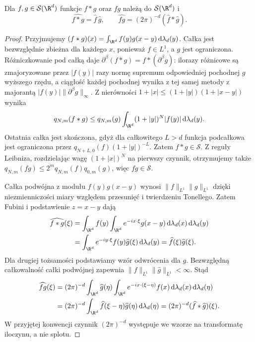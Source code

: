 \begin{wniosek}
\label{cor:pde8-convolution}
Dla $f,g\in\mathcal S(\R^d)$ funkcje $f*g$ oraz
$fg$ należą do $\mathcal S(\R^d)$ i
\[
 \widehat{f*g}=\widehat f\,\widehat g,\qquad
 \widehat{fg}=(2\pi)^{-d}(\widehat f*\widehat g).
\]
\end{wniosek}
\begin{proof}
Przyjmujemy $(f*g)(x)=\int_{\R^d}f(y)g(x-y)
\,\mathrm d\lambda_d(y)$. Całka jest bezwzględnie
zbieżna dla każdego $x$, ponieważ $f\in L^1$,
a $g$ jest ograniczona.
Różniczkowanie pod całką daje
$\partial^\beta(f*g)=f*(\partial^\beta g)$:
ilorazy różnicowe są zmajoryzowane przez
$|f(y)|$ razy normę supremum odpowiedniej
pochodnej $g$ wyższego rzędu, a ciągłość każdej
pochodnej wynika z tej samej metody z majorantą
$|f(y)|\|\partial^\beta g\|_\infty$.
Z nierówności
$1+|x|\le(1+|y|)(1+|x-y|)$ wynika
\[
 q_{N,m}(f*g)
 \le q_{N,m}(g)
 \int_{\R^d}(1+|y|)^N|f(y)|\,\mathrm d\lambda_d(y).
\]
Ostatnia całka jest skończona, gdyż dla
całkowitego $L>d$ funkcja podcałkowa jest
ograniczona przez $q_{N+L,0}(f)(1+|y|)^{-L}$.
Zatem $f*g\in\mathcal S$.
Z reguły Leibniza, rozdzielając wagę
$(1+|x|)^N$ na pierwszy czynnik,
otrzymujemy także
$q_{N,m}(fg)\le 2^m q_{N,m}(f)q_{0,m}(g)$,
więc $fg\in\mathcal S$.

Całka podwójna z modułu $f(y)g(x-y)$
wynosi $\|f\|_{L^1}\|g\|_{L^1}$ dzięki
niezmienniczości miary względem przesunięć
i twierdzeniu Tonellego. Zatem Fubini
i podstawienie $z=x-y$ dają
\[
 \begin{aligned}
 \widehat{f*g}(\xi)
 &=\int_{\R^d}f(y)
 \int_{\R^d}e^{-ix\cdot\xi}g(x-y)
 \,\mathrm d\lambda_d(x)\,\mathrm d\lambda_d(y)\\
 &=\int_{\R^d}e^{-iy\cdot\xi}f(y)
 \widehat g(\xi)\,\mathrm d\lambda_d(y)
 =\widehat f(\xi)\widehat g(\xi).
 \end{aligned}
\]
Dla drugiej tożsamości podstawiamy wzór
odwrócenia dla $g$. Bezwzględną całkowalność
całki podwójnej zapewnia
$\|f\|_{L^1}\|\widehat g\|_{L^1}<\infty$.
Stąd
\[
 \begin{aligned}
 \widehat{fg}(\xi)
 &=(2\pi)^{-d}\int_{\R^d}\widehat g(\eta)
 \int_{\R^d}e^{-ix\cdot(\xi-\eta)}f(x)
 \,\mathrm d\lambda_d(x)\,\mathrm d\lambda_d(\eta)\\
 &=(2\pi)^{-d}\int_{\R^d}
 \widehat f(\xi-\eta)\widehat g(\eta)
 \,\mathrm d\lambda_d(\eta)
 =(2\pi)^{-d}(\widehat f*\widehat g)(\xi).
 \end{aligned}
\]
W przyjętej konwencji czynnik $(2\pi)^{-d}$
występuje we wzorze na transformatę iloczynu,
a nie splotu.
\end{proof}


